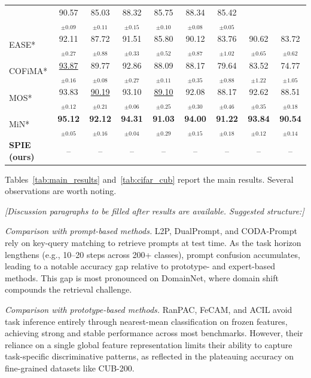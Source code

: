 \begin{table}[h]
{\begin{tabular}{lcccccccc}
& 90.57$_{\pm 0.09}$ & 85.03$_{\pm 0.11}$
& 88.32$_{\pm 0.15}$ & 85.75$_{\pm 0.10}$
& 88.34$_{\pm 0.08}$ & 85.42$_{\pm 0.05}$ \\
EASE*
& 92.11$_{\pm 0.27}$ & 87.72$_{\pm 0.88}$
& 91.51$_{\pm 0.33}$ & 85.80$_{\pm 0.52}$
& 90.12$_{\pm 0.87}$ & 83.76$_{\pm 1.02}$
& 90.62$_{\pm 0.65}$ & 83.72$_{\pm 0.62}$ \\
COFiMA*
& \underline{93.87}$_{\pm 0.16}$ & 89.77$_{\pm 0.08}$
& 92.86$_{\pm 0.27}$ & 88.09$_{\pm 0.11}$
& 88.17$_{\pm 0.35}$ & 79.64$_{\pm 0.88}$
& 83.52$_{\pm 1.22}$ & 74.77$_{\pm 1.05}$ \\
MOS*
& 93.83$_{\pm 0.12}$ & \underline{90.19}$_{\pm 0.21}$
& 93.10$_{\pm 0.06}$ & \underline{89.10}$_{\pm 0.25}$
& 92.08$_{\pm 0.30}$ & 88.17$_{\pm 0.46}$
& 92.62$_{\pm 0.35}$ & 88.51$_{\pm 0.18}$ \\
MiN*
& \textbf{95.12}$_{\pm 0.05}$ & \textbf{92.12}$_{\pm 0.16}$
& \textbf{94.31}$_{\pm 0.04}$ & \textbf{91.03}$_{\pm 0.29}$
& \textbf{94.00}$_{\pm 0.15}$ & \textbf{91.22}$_{\pm 0.18}$
& \textbf{93.84}$_{\pm 0.12}$ & \textbf{90.54}$_{\pm 0.14}$ \\
\midrule

\textbf{SPIE (ours)}
& -- & --
& -- & --
& -- & --
& -- & -- \\
\bottomrule
\end{tabular}
}
\end{table}

Tables~\ref{tab:main_results} and~\ref{tab:cifar_cub} report the main results. Several observations are worth noting. 

\textit{[Discussion paragraphs to be filled after results are available. Suggested structure:]}

\textit{Comparison with prompt-based methods.} L2P, DualPrompt, and CODA-Prompt rely on key-query matching to retrieve prompts at test time. As the task horizon lengthens (e.g., 10--20 steps across 200+ classes), prompt confusion accumulates, leading to a notable accuracy gap relative to prototype- and expert-based methods. This gap is most pronounced on DomainNet, where domain shift compounds the retrieval challenge.

\textit{Comparison with prototype-based methods.} RanPAC, FeCAM, and ACIL avoid task inference entirely through nearest-mean classification on frozen features, achieving strong and stable performance across most benchmarks. However, their reliance on a single global feature representation limits their ability to capture task-specific discriminative patterns, as reflected in the plateauing accuracy on fine-grained datasets like CUB-200.

